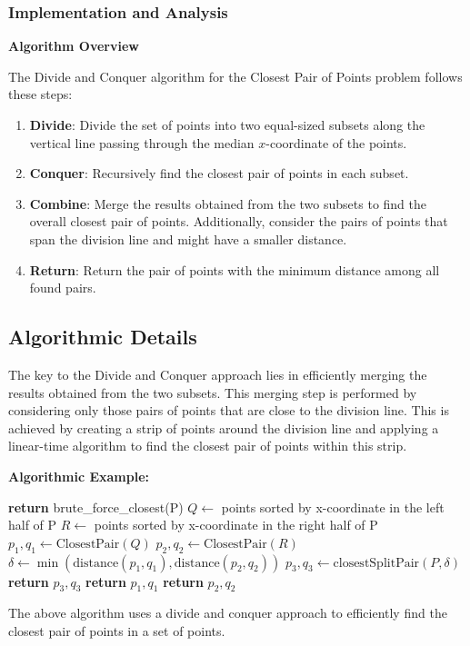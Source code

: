 \documentclass[12pt]{book} %
\begin{document}
\subsubsection{Implementation and Analysis}
\textbf{Algorithm Overview}

The Divide and Conquer algorithm for the Closest Pair of Points problem follows these steps:

\begin{enumerate}
    \item \textbf{Divide}: Divide the set of points into two equal-sized subsets along the vertical line passing through the median \( x \)-coordinate of the points.
    \item \textbf{Conquer}: Recursively find the closest pair of points in each subset.
    \item \textbf{Combine}: Merge the results obtained from the two subsets to find the overall closest pair of points. Additionally, consider the pairs of points that span the division line and might have a smaller distance.
    \item \textbf{Return}: Return the pair of points with the minimum distance among all found pairs.
\end{enumerate}

\subsection{Algorithmic Details}

The key to the Divide and Conquer approach lies in efficiently merging the results obtained from the two subsets. This merging step is performed by considering only those pairs of points that are close to the division line. This is achieved by creating a strip of points around the division line and applying a linear-time algorithm to find the closest pair of points within this strip.


\textbf{Algorithmic Example:}
\FloatBarrier
\begin{algorithm}
\caption{Closest Pair of Points}
\begin{algorithmic}[1]
    \State \textbf{return} brute\_force\_closest(P)
\EndIf
\State $Q \gets$ points sorted by x-coordinate in the left half of P
\State $R \gets$ points sorted by x-coordinate in the right half of P
\State $p_1, q_1 \gets \text{ClosestPair}(Q)$
\State $p_2, q_2 \gets \text{ClosestPair}(R)$
\State $\delta \gets \min(\text{distance}(p_1, q_1), \text{distance}(p_2, q_2))$
\State $p_3, q_3 \gets \text{closestSplitPair}(P, \delta)$
    \State \textbf{return} $p_3, q_3$
\Else
        \State \textbf{return} $p_1, q_1$
    \Else
        \State \textbf{return} $p_2, q_2$
    \EndIf
\EndIf
\EndFunction
\end{algorithmic}
\end{algorithm}
\FloatBarrier
The above algorithm uses a divide and conquer approach to efficiently find the closest pair of points in a set of points.
\end{document}
